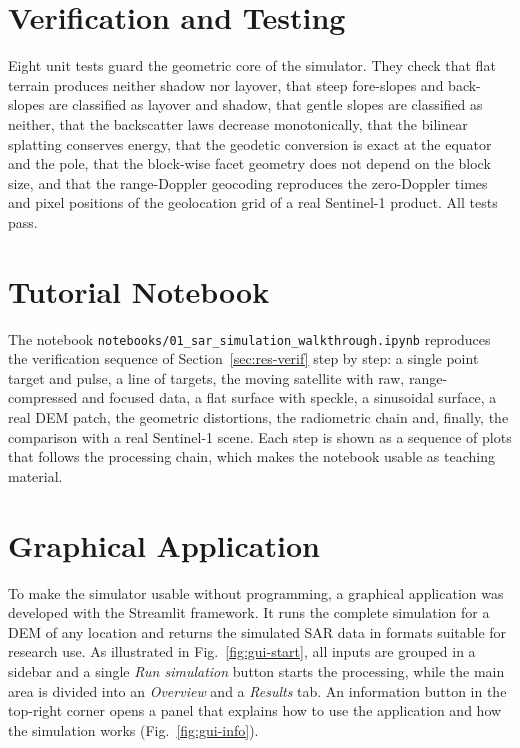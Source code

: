 \section{Verification and Testing}
Eight unit tests guard the geometric core of the simulator. They check that flat terrain produces neither shadow nor
layover, that steep fore-slopes and back-slopes are classified as layover and shadow, that gentle slopes are
classified as neither, that the backscatter laws decrease monotonically, that the bilinear splatting conserves energy,
that the geodetic conversion is exact at the equator and the pole, that the block-wise facet geometry does not depend on
the block size, and that the range-Doppler geocoding reproduces the zero-Doppler times and pixel positions of the
geolocation grid of a real Sentinel-1 product. All tests pass.

\section{Tutorial Notebook}
The notebook \texttt{notebooks/01\_sar\_simulation\_walkthrough.ipynb} reproduces the verification sequence of
Section~\ref{sec:res-verif} step by step: a single point target and pulse, a line of targets, the moving satellite with
raw, range-compressed and focused data, a flat surface with speckle, a sinusoidal surface, a real DEM patch, the
geometric distortions, the radiometric chain and, finally, the comparison with a real Sentinel-1 scene. Each step is
shown as a sequence of plots that follows the processing chain, which makes the notebook usable as teaching material.

\section{Graphical Application}
\label{sec:gui}
To make the simulator usable without programming, a graphical application was developed with the Streamlit framework.
It runs the complete simulation for a DEM of any location and returns the simulated SAR data in formats suitable for
research use. As illustrated in Fig.~\ref{fig:gui-start}, all inputs are grouped in a sidebar and a single
\emph{Run simulation} button starts the processing, while the main area is divided into an \emph{Overview} and a
\emph{Results} tab. An information button in the top-right corner opens a panel that explains how to use the
application and how the simulation works (Fig.~\ref{fig:gui-info}).

